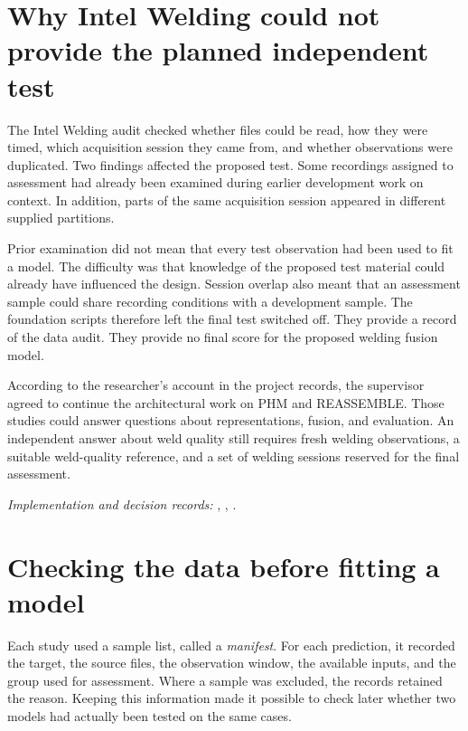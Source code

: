 \section{Why Intel Welding could not provide the planned independent test}
\label{sec:ch4-welding}

The Intel Welding audit checked whether files could be read, how they were timed, which acquisition session they came from, and whether observations were duplicated. Two findings affected the proposed test. Some recordings assigned to assessment had already been examined during earlier development work on context. In addition, parts of the same acquisition session appeared in different supplied partitions.

Prior examination did not mean that every test observation had been used to fit a model. The difficulty was that knowledge of the proposed test material could already have influenced the design. Session overlap also meant that an assessment sample could share recording conditions with a development sample. The foundation scripts therefore left the final test switched off. They provide a record of the data audit. They provide no final score for the proposed welding fusion model.

According to the researcher’s account in the project records, the supervisor agreed to continue the architectural work on PHM and REASSEMBLE. Those studies could answer questions about representations, fusion, and evaluation. An independent answer about weld quality still requires fresh welding observations, a suitable weld-quality reference, and a set of welding sessions reserved for the final assessment.

\noindent\textit{Implementation and decision records:} , , .

\section{Checking the data before fitting a model}
\label{sec:ch4-admission}

Each study used a sample list, called a \emph{manifest}. For each prediction, it recorded the target, the source files, the observation window, the available inputs, and the group used for assessment. Where a sample was excluded, the records retained the reason. Keeping this information made it possible to check later whether two models had actually been tested on the same cases.

